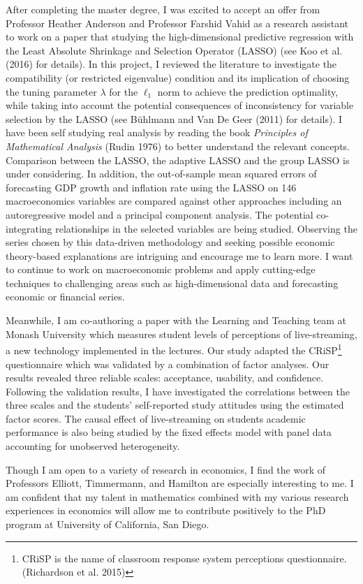 \documentclass[12pt,]{article}
\let\rmarkdownfootnote\footnote%
\def\footnote{\protect\rmarkdownfootnote}
\begin{document}
After completing the master degree, I was excited to accept an offer
from Professor Heather Anderson and Professor Farshid Vahid as a
research assistant to work on a paper that studying the high-dimensional
predictive regression with the Least Absolute Shrinkage and Selection
Operator (LASSO) (see Koo et al. (2016) for details). In this project, I
reviewed the literature to investigate the compatibility (or restricted
eigenvalue) condition and its implication of choosing the tuning
parameter \(\lambda\) for the \(\ell_1\) norm to achieve the prediction
optimality, while taking into account the potential consequences of
inconsistency for variable selection by the LASSO (see Bühlmann and Van
De Geer (2011) for details). I have been self studying real analysis by
reading the book \emph{Principles of Mathematical Analysis} (Rudin 1976)
to better understand the relevant concepts. Comparison between the
LASSO, the adaptive LASSO and the group LASSO is under considering. In
addition, the out-of-sample mean squared errors of forecasting GDP
growth and inflation rate using the LASSO on 146 macroeconomics
variables are compared against other approaches including an
autoregressive model and a principal component analysis. The potential
co-integrating relationships in the selected variables are being
studied. Observing the series chosen by this data-driven methodology and
seeking possible economic theory-based explanations are intriguing and
encourage me to learn more. I want to continue to work on macroeconomic
problems and apply cutting-edge techniques to challenging areas such as
high-dimensional data and forecasting economic or financial series.

Meanwhile, I am co-authoring a paper with the Learning and Teaching team
at Monash University which measures student levels of perceptions of
live-streaming, a new technology implemented in the lectures. Our study
adapted the CRiSP\footnote{CRiSP is the name of classroom response
  system perceptions questionnaire. (Richardson et al. 2015)}
questionnaire which was validated by a combination of factor analyses.
Our results revealed three reliable scales: acceptance, usability, and
confidence. Following the validation results, I have investigated the
correlations between the three scales and the students' self-reported
study attitudes using the estimated factor scores. The causal effect of
live-streaming on students academic performance is also being studied by
the fixed effects model with panel data accounting for unobserved
heterogeneity.

Though I am open to a variety of research in economics, I find the work
of Professors Elliott, Timmermann, and Hamilton are especially
interesting to me. I am confident that my talent in mathematics combined
with my various research experiences in economics will allow me to
contribute positively to the PhD program at University of California,
San Diego.
\end{document}
